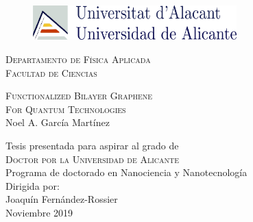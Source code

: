 \begin{titlepage}

\vspace{20pt}
\begin{figure}[!ht]
\centering
\includegraphics[width=0.7\textwidth]{logo_ua.pdf}
\end{figure}

\begin{center}
\begingroup \linespread{1,75} 
\textsc{\large{Departamento de Física Aplicada}}\\
\textsc{\large{Facultad de Ciencias}}\\[1,5cm]
\endgroup

\begingroup \linespread{1,75} \selectfont
\textsc{{\LARGE
      Functionalized Bilayer Graphene\\
      For Quantum Technologies}}\\[1,5cm]
Noel A. García Martínez\\[2,5cm]
\endgroup

Tesis presentada para aspirar al grado de\\
\textsc{Doctor por la Universidad de Alicante}\\[1.5cm]
Programa de doctorado en Nanociencia y Nanotecnología\\[2cm]

Dirigida por:\\
Joaquín Fernández-Rossier\\[2cm]

Noviembre 2019
\end{center}

\vfill
\end{titlepage}
